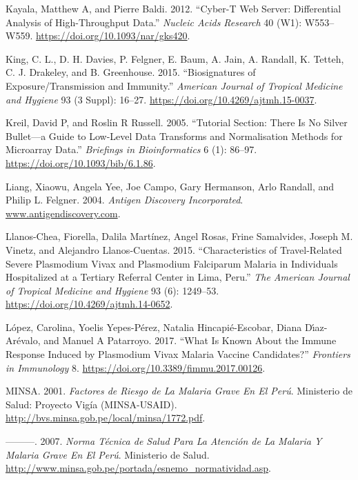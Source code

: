 \documentclass[
  a4paper]{article}
\begin{document}
\leavevmode\hypertarget{ref-kayala2012cyber}{}%
Kayala, Matthew A, and Pierre Baldi. 2012. ``Cyber-T Web Server:
Differential Analysis of High-Throughput Data.'' \emph{Nucleic Acids
Research} 40 (W1): W553--W559. \url{https://doi.org/10.1093/nar/gks420}.

\leavevmode\hypertarget{ref-King2015FOC}{}%
King, C. L., D. H. Davies, P. Felgner, E. Baum, A. Jain, A. Randall, K.
Tetteh, C. J. Drakeley, and B. Greenhouse. 2015. ``Biosignatures of
Exposure/Transmission and Immunity.'' \emph{American Journal of Tropical
Medicine and Hygiene} 93 (3 Suppl): 16--27.
\url{https://doi.org/10.4269/ajtmh.15-0037}.

\leavevmode\hypertarget{ref-kreil2005bullet}{}%
Kreil, David P, and Roslin R Russell. 2005. ``Tutorial Section: There Is
No Silver Bullet---a Guide to Low-Level Data Transforms and
Normalisation Methods for Microarray Data.'' \emph{Briefings in
Bioinformatics} 6 (1): 86--97. \url{https://doi.org/10.1093/bib/6.1.86}.

\leavevmode\hypertarget{ref-adiinc}{}%
Liang, Xiaowu, Angela Yee, Joe Campo, Gary Hermanson, Arlo Randall, and
Philip L. Felgner. 2004. \emph{Antigen Discovery Incorporated}.
\url{www.antigendiscovery.com}.

\leavevmode\hypertarget{ref-llanoschea2015}{}%
Llanos-Chea, Fiorella, Dalila Martínez, Angel Rosas, Frine Samalvides,
Joseph M. Vinetz, and Alejandro Llanos-Cuentas. 2015. ``Characteristics
of Travel-Related Severe Plasmodium Vivax and Plasmodium Falciparum
Malaria in Individuals Hospitalized at a Tertiary Referral Center in
Lima, Peru.'' \emph{The American Journal of Tropical Medicine and
Hygiene} 93 (6): 1249--53. \url{https://doi.org/10.4269/ajtmh.14-0652}.

\leavevmode\hypertarget{ref-lopez2017}{}%
López, Carolina, Yoelis Yepes-Pérez, Natalia Hincapié-Escobar, Diana
Dı́az-Arévalo, and Manuel A Patarroyo. 2017. ``What Is Known About the
Immune Response Induced by Plasmodium Vivax Malaria Vaccine
Candidates?'' \emph{Frontiers in Immunology} 8.
\url{https://doi.org/10.3389/fimmu.2017.00126}.

\leavevmode\hypertarget{ref-factores2001}{}%
MINSA. 2001. \emph{Factores de Riesgo de La Malaria Grave En El Perú}.
Ministerio de Salud: Proyecto Vigía (MINSA-USAID).
\url{http://bvs.minsa.gob.pe/local/minsa/1772.pdf}.

\leavevmode\hypertarget{ref-norma2001}{}%
---------. 2007. \emph{Norma Técnica de Salud Para La Atención de La
Malaria Y Malaria Grave En El Perú}. Ministerio de Salud.
\url{http://www.minsa.gob.pe/portada/esnemo_normatividad.asp}.
\end{document}
